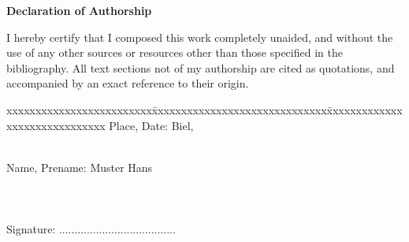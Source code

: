 \setcounter{page}{7}
{}

\LARGE\textbf{\textbf{Declaration of Authorship}}
\normalsize
\vspace*{10mm} 


I hereby certify that I composed this work completely unaided, and without the use of any other sources or resources other than those specified in the bibliography. All text sections not of my authorship are cited as quotations, and accompanied by an exact reference to their origin.


\vspace{15mm}


\begin{tabbing}
	xxxxxxxxxxxxxxxxxxxxxxxxx\=xxxxxxxxxxxxxxxxxxxxxxxxxxxxxx\=xxxxxxxxxxxxxxxxxxxxxxxxxxxxxx\kill
	Place, Date:		\> Biel, \date \\ \\ 
	Name, Prename:		\> Muster Hans	\>  \\ \\ \\ \\ 
	Signature:			\> ......................................\> \\
\end{tabbing}
